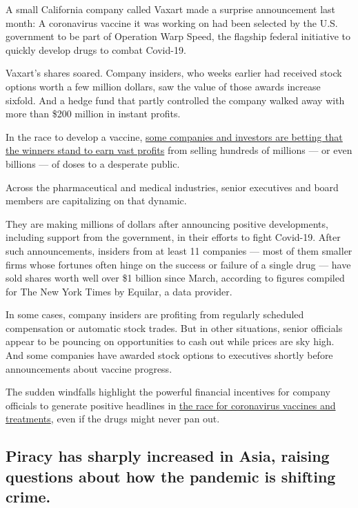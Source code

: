 A small California company called Vaxart made a surprise announcement
last month: A coronavirus vaccine it was working on had been selected by
the U.S. government to be part of Operation Warp Speed, the flagship
federal initiative to quickly develop drugs to combat Covid-19.

Vaxart's shares soared. Company insiders, who weeks earlier had received
stock options worth a few million dollars, saw the value of those awards
increase sixfold. And a hedge fund that partly controlled the company
walked away with more than \$200 million in instant profits.

In the race to develop a vaccine,
\href{https://www.nytimes3xbfgragh.onion/2020/07/25/business/coronavirus-vaccine-profits-vaxart.html}{some
companies and investors are betting that the winners stand to earn vast
profits} from selling hundreds of millions --- or even billions --- of
doses to a desperate public.

Across the pharmaceutical and medical industries, senior executives and
board members are capitalizing on that dynamic.

They are making millions of dollars after announcing positive
developments, including support from the government, in their efforts to
fight Covid-19. After such announcements, insiders from at least 11
companies --- most of them smaller firms whose fortunes often hinge on
the success or failure of a single drug --- have sold shares worth well
over \$1 billion since March, according to figures compiled for The New
York Times by Equilar, a data provider.

In some cases, company insiders are profiting from regularly scheduled
compensation or automatic stock trades. But in other situations, senior
officials appear to be pouncing on opportunities to cash out while
prices are sky high. And some companies have awarded stock options to
executives shortly before announcements about vaccine progress.

The sudden windfalls highlight the powerful financial incentives for
company officials to generate positive headlines in
\href{https://www.nytimes3xbfgragh.onion/interactive/2020/science/coronavirus-vaccine-tracker.html}{the
race for coronavirus vaccines and treatments}, even if the drugs might
never pan out.

\hypertarget{piracy-has-sharply-increased-in-asia-raising-questions-about-how-the-pandemic-is-shifting-crime}{%
\subsection{Piracy has sharply increased in Asia, raising questions
about how the pandemic is shifting
crime.}\label{piracy-has-sharply-increased-in-asia-raising-questions-about-how-the-pandemic-is-shifting-crime}}

